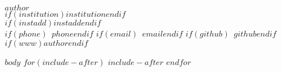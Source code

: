 \documentclass[letterpaper,11pt]{article}
\begin{document}
 \begin{center}
      \textbf{ \textsc{\Large \color{black} $author$}} \\
       \smallskip
       $if(institution)$\small{$institution$}$endif$\\
       $if(instadd)$\small{$instadd$}$endif$\\
       $if(phone)$\Telefon\ $phone$$endif$  \enspace
       $if(email)$\Letter\ $email$$endif$\enspace 
       $if(github)$\faGithub\ \href{https://github.com/$github$}{$github$}$endif$\enspace
       $if(www)$\faGlobe \href{$www$}{$author$}$endif$
   \end{center} 
   

$body$
$for(include-after)$
$include-after$
$endfor$
\end{document}
